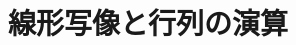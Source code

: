 \documentclass[../../topic_linear-algebra]{subfiles}
\begin{document}
\chapter{線形写像と行列の演算}






\end{document}
